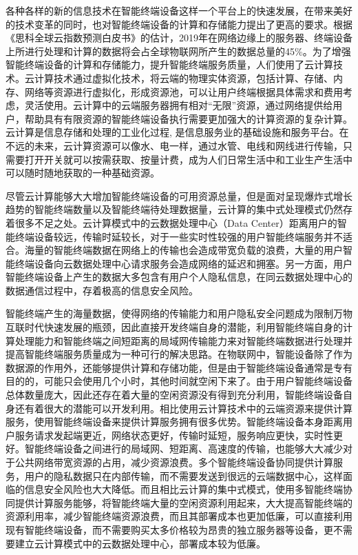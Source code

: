 各种各样的新的信息技术在智能终端设备这样一个平台上的快速发展，在带来美好的技术变革的同时，也对智能终端设备的计算和存储能力提出了更高的要求。根据《思科全球云指数预测白皮书》的估计，2019年在网络边缘上的服务器、终端设备上所进行处理和计算的数据将会占全球物联网所产生的数据总量的45\%\citep{Cisco2016}。为了增强智能终端设备的计算和存储能力，提升智能终端服务质量，人们使用了云计算技术。云计算技术通过虚拟化技术，将云端的物理实体资源，包括计算、存储、内存、网络等资源进行虚拟化，形成资源池，可以让用户终端根据具体需求和费用考虑，灵活使用。云计算中的云端服务器拥有相对“无限”资源，通过网络提供给用户，帮助具有有限资源的智能终端设备执行需要更加强大的计算资源的复杂计算\citep{Noor.2018}。云计算是信息存储和处理的工业化过程, 是信息服务业的基础设施和服务平台\citep{江绵恒2010}。在不远的未来，云计算资源可以像水、电一样，通过水管、电线和网线进行传输，只需要打开开关就可以按需获取、按量计费，成为人们日常生活中和工业生产生活中可以随时随地获取的一种基础资源\citep{buyya2009cloud}。

尽管云计算能够大大增加智能终端设备的可用资源总量，但是面对呈现爆炸式增长趋势的智能终端数量以及智能终端待处理数据量，云计算的集中式处理模式仍然存着很多不足之处。云计算模式中的云数据处理中心（Data Center）距离用户的智能终端设备较远，传输时延较长，对于一些实时性较强的用户智能终端服务并不适合。海量的智能终端数据在网络上的传输也会造成带宽负载的浪费，大量的用户智能终端设备向云数据处理中心请求服务会造成网络的延迟和拥塞\citep{Ismail2016Evaluation}。另一方面，用户智能终端设备上产生的数据大多包含有用户个人隐私信息，在同云数据处理中心的数据通信过程中，存着极高的信息安全风险。

智能终端产生的海量数据，使得网络的传输能力和用户隐私安全问题成为限制万物互联时代快速发展的瓶颈，因此直接开发终端自身的潜能\citep{王劲林2015一种现场}，利用智能终端自身的计算处理能力和智能终端之间短距离的局域网传输能力来对智能终端数据进行处理并提高智能终端服务质量成为一种可行的解决思路。在物联网中，智能设备除了作为数据源的作用外，还能够提供计算和存储功能，但是由于智能终端设备通常是专有目的的，可能只会使用几个小时，其他时间就空闲下来了\citep{renner2016towards}。由于用户智能终端设备总体数量庞大，因此还存在着大量的空闲资源没有得到充分利用，智能终端设备自身还有着很大的潜能可以开发利用。相比使用云计算技术中的云端资源来提供计算服务，使用智能终端设备来提供计算服务拥有很多优势。智能终端设备本身距离用户服务请求发起端更近，网络状态更好，传输时延短，服务响应更快，实时性更好。智能终端设备之间进行的局域网、短距离、高速度的传输，也能够大大减少对于公共网络带宽资源的占用，减少资源浪费。多个智能终端设备协同提供计算服务，用户的隐私数据只在内部传输，而不需要发送到很远的云端数据中心，这样面临的信息安全风险也大大降低。而且相比云计算的集中式模式，使用多智能终端协同提供计算服务能够，将智能终端大量的空闲资源利用起来，大大提高智能终端的资源利用率，减少智能终端资源浪费，而且其部署成本也更加低廉，可以直接利用现有智能终端设备，而不需要购买太多价格较为昂贵的独立服务器等设备，更不需要建立云计算模式中的云数据处理中心，部署成本较为低廉。

